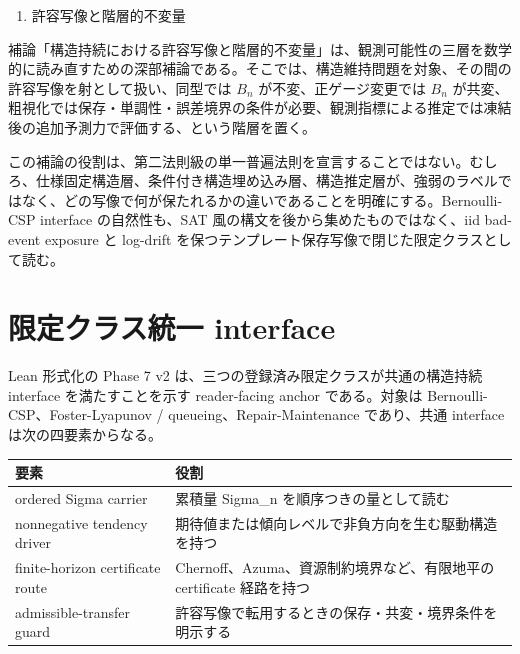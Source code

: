 \documentclass[12pt,a4paper]{article}
\begin{document}
\begin{enumerate}
\def\labelenumi{\arabic{enumi}.}
\setcounter{enumi}{8}
\tightlist
\item
  許容写像と階層的不変量
\end{enumerate}

補論「構造持続における許容写像と階層的不変量」は、観測可能性の三層を数学的に読み直すための深部補論である。そこでは、構造維持問題を対象、その間の許容写像を射として扱い、同型では \(B_{n}\) が不変、正ゲージ変更では \(B_{n}\) が共変、粗視化では保存・単調性・誤差境界の条件が必要、観測指標による推定では凍結後の追加予測力で評価する、という階層を置く。

この補論の役割は、第二法則級の単一普遍法則を宣言することではない。むしろ、仕様固定構造層、条件付き構造埋め込み層、構造推定層が、強弱のラベルではなく、どの写像で何が保たれるかの違いであることを明確にする。Bernoulli-CSP interface の自然性も、SAT 風の構文を後から集めたものではなく、iid bad-event exposure と log-drift を保つテンプレート保存写像で閉じた限定クラスとして読む。

\section{限定クラス統一 interface}\label{ux9650ux5b9aux30afux30e9ux30b9ux7d71ux4e00-interface}

Lean 形式化の Phase 7 v2 は、三つの登録済み限定クラスが共通の構造持続 interface を満たすことを示す reader-facing anchor である。対象は Bernoulli-CSP、Foster-Lyapunov / queueing、Repair-Maintenance であり、共通 interface は次の四要素からなる。

{\def\LTcaptype{table} %
\begin{longtable}[]{@{}
  >{\raggedright\arraybackslash}p{}
  >{\raggedright\arraybackslash}p{}@{}}
\toprule\noalign{}
\begin{minipage}[b]{\linewidth}\raggedright
要素
\end{minipage} & \begin{minipage}[b]{\linewidth}\raggedright
役割
\end{minipage} \\
\midrule\noalign{}
\endhead
\bottomrule\noalign{}
\endlastfoot
ordered Sigma carrier & 累積量 Sigma\_n を順序つきの量として読む \\
nonnegative tendency driver & 期待値または傾向レベルで非負方向を生む駆動構造を持つ \\
finite-horizon certificate route & Chernoff、Azuma、資源制約境界など、有限地平の certificate 経路を持つ \\
admissible-transfer guard & 許容写像で転用するときの保存・共変・境界条件を明示する \\
\end{longtable}
}
\end{document}
